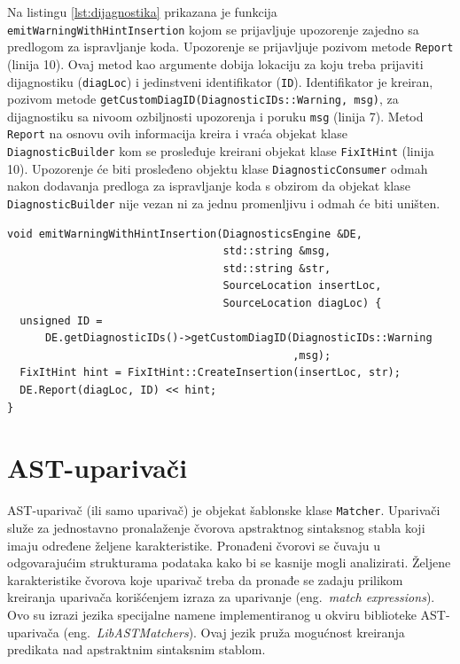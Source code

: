 \documentclass[12pt,oneside]{memoir}
\begin{document}
Na listingu \ref{lst:dijagnostika} prikazana je funkcija \texttt{emitWarningWithHintInsertion} kojom se prijavljuje
upozorenje zajedno sa predlogom za ispravljanje koda. Upozorenje se prijavljuje pozivom metode \texttt{Report} (linija 10). Ovaj metod kao argumente
dobija lokaciju za koju treba prijaviti dijagnostiku (\texttt{diagLoc}) i jedinstveni identifikator (\texttt{ID}). Identifikator je kreiran, pozivom metode \texttt{getCustomDiagID(DiagnosticIDs\-::Warning, msg)}, za dijagnostiku sa nivoom ozbiljnosti upozorenja i poruku \texttt{msg} (linija 7). Metod \texttt{Report} na osnovu ovih informacija kreira i vra\'{c}a
objekat klase \texttt{DiagnosticBui\-lder} kom se prosleđuje kreirani objekat klase \texttt{FixItHint} (linija 10). Upozorenje \'{c}e biti prosleđeno
objektu klase \texttt{DiagnosticConsumer} odmah nakon dodavanja predloga za ispravljanje koda s obzirom da objekat klase \texttt{DiagnosticBuilder}
nije vezan ni za jednu promenljivu i odmah \'{c}e biti uni\v{s}ten.

\begin{lstlisting}[style=customc, caption={Primer prijavljivanja dijagnostike u kompajleru \textit{Clang}.}, label=lst:dijagnostika]
void emitWarningWithHintInsertion(DiagnosticsEngine &DE, 
                                  std::string &msg,
                                  std::string &str, 
                                  SourceLocation insertLoc,
                                  SourceLocation diagLoc) {
  unsigned ID =
      DE.getDiagnosticIDs()->getCustomDiagID(DiagnosticIDs::Warning
                                             ,msg);
  FixItHint hint = FixItHint::CreateInsertion(insertLoc, str);
  DE.Report(diagLoc, ID) << hint;
}
\end{lstlisting}

\section{AST-upariva\v{c}i}
\label{sec:matchers}

AST-upariva\v{c} (ili samo upariva\v{c}) je objekat \v{s}ablonske klase \texttt{Matcher}. Upariva\v{c}i slu\v{z}e za jednostavno
pronala\v{z}enje \v{c}vorova apstraktnog sintaksnog stabla koji imaju određene \v{z}eljene karakteristike. Pronađeni \v{c}vorovi se 
\v{c}uvaju u odgovaraju\'{c}im strukturama podataka kako bi se kasnije mogli analizirati. \v{Z}eljene karakteristike \v{c}vorova koje upariva\v{c} treba da pronađe se zadaju prilikom kreiranja upariva\v{c}a kori\v{s}\'{c}enjem izraza za uparivanje (eng.~\textit{match expressions}).
Ovo su izrazi jezika specijalne namene implementiranog u okviru biblioteke AST-upariva\v{c}a (eng.~\textit{LibASTMatchers}). Ovaj jezik pru\v{z}a mogu\'{c}nost kreiranja predikata nad apstraktnim sintaksnim stablom.
\end{document}
